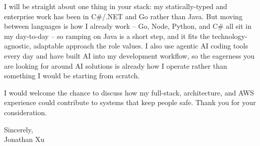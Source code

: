 \documentclass[11pt,a4paper]{article}
\begin{document}
I will be straight about one thing in your stack: my statically-typed and enterprise work has been in C\#/.NET and Go rather than Java. But moving between languages is how I already work -- Go, Node, Python, and C\# all sit in my day-to-day -- so ramping on Java is a short step, and it fits the technology-agnostic, adaptable approach the role values. I also use agentic AI coding tools every day and have built AI into my development workflow, so the eagerness you are looking for around AI solutions is already how I operate rather than something I would be starting from scratch.

I would welcome the chance to discuss how my full-stack, architecture, and AWS experience could contribute to systems that keep people safe. Thank you for your consideration.

\vspace{0.5em}

Sincerely, \\
Jonathan Xu
\end{document}
